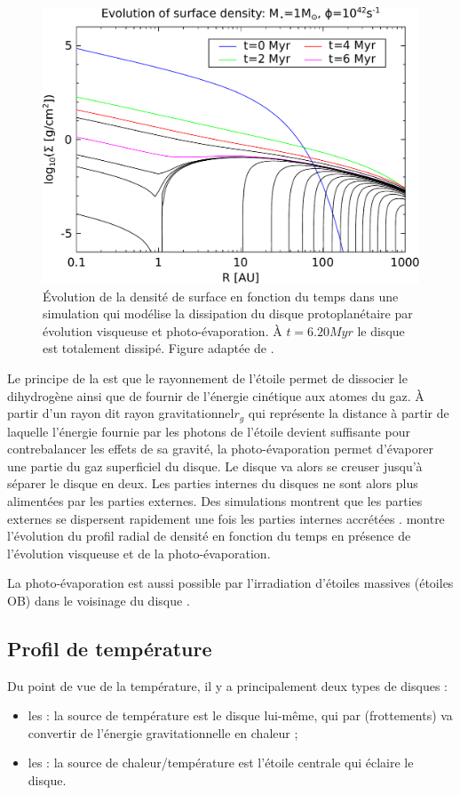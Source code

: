 \begin{figure}[htbp]
\centering
\includegraphics[width=0.65\linewidth]{figure/disk_dispersion.pdf}
\caption[Dissipation du disque]{Évolution de la densité de surface en fonction du temps dans une simulation qui modélise la
dissipation du disque protoplanétaire par évolution visqueuse et photo-évaporation. À $t=6.20\unit{Myr}$ le disque est
totalement dissipé. Figure adaptée de \cite{alexander2006photoevaporation}.}\label{fig:disk_dispersion}
\end{figure}

Le principe de la  est que le rayonnement de l'étoile permet de dissocier le dihydrogène ainsi que de fournir de l'énergie cinétique aux atomes du gaz. À partir d'un rayon dit \og rayon gravitationnel\fg $r_g$ qui représente la distance à partir de laquelle l'énergie fournie par les photons de l'étoile devient suffisante pour contrebalancer les effets de sa gravité, la photo-évaporation permet d'évaporer une partie du gaz superficiel du disque. Le disque va alors se creuser jusqu'à séparer le disque en deux. Les parties internes du disques ne sont alors plus alimentées par les parties externes. Des simulations montrent que les parties externes se dispersent rapidement une fois les parties internes accrétées \citep{alexander2006photoevaporation}.  montre l'évolution du profil radial de densité en fonction du temps en présence de l'évolution visqueuse et de la photo-évaporation.

La photo-évaporation est aussi possible par l'irradiation d'étoiles massives (étoiles OB) dans le voisinage du disque \citep{adams2004photoevaporation}.

\subsection{Profil de température}
Du point de vue de la température, il y a principalement deux types de disques : 
\begin{itemize}
\item les  : la source de température est le disque lui-même, qui par  (frottements) va convertir de l'énergie gravitationnelle en chaleur ;
\item les  : la source de chaleur/température est l'étoile centrale qui éclaire le disque. 
\end{itemize}

